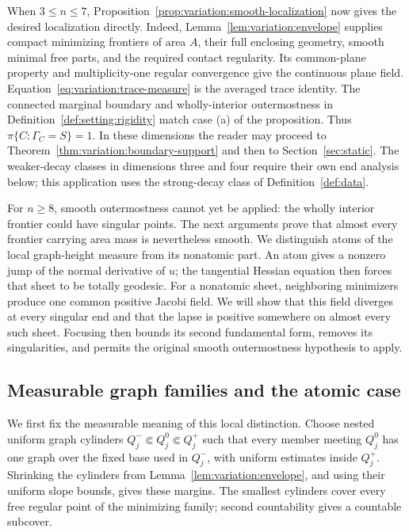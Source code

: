 When $3\leq n\leq7$, Proposition~\ref{prop:variation:smooth-localization}
now gives the desired localization directly. Indeed,
Lemma~\ref{lem:variation:envelope} supplies compact minimizing frontiers
of area $A$, their full enclosing geometry, smooth minimal free parts,
and the required contact regularity. Its common-plane property and
multiplicity-one regular convergence give the continuous plane field.
Equation~\eqref{eq:variation:trace-measure} is the averaged trace identity.
The connected marginal boundary and wholly-interior outermostness in
Definition~\ref{def:setting:rigidity} match case \textup{(a)} of the
proposition. Thus $\pi\{C:\Gamma_C=S\}=1$.
In these dimensions the reader may proceed to
Theorem~\ref{thm:variation:boundary-support} and then to
Section~\ref{sec:static}. The weaker-decay classes in dimensions three
and four require their own end analysis below; this application uses
the strong-decay class of Definition~\ref{def:data}.


For $n\geq8$, smooth outermostness cannot yet be applied: the wholly
interior frontier could have singular points. The next arguments prove
that almost every frontier carrying area mass is nevertheless smooth.
We distinguish atoms of the local graph-height measure from its
nonatomic part.
An atom gives a nonzero jump of the normal derivative of $u$; the
tangential Hessian equation then forces that sheet to be totally
geodesic. For a nonatomic sheet, neighboring minimizers produce one
common positive Jacobi field. We will show that this field diverges
at every singular end and that the lapse is positive somewhere on
almost every such sheet. Focusing then bounds its second fundamental
form, removes its singularities, and permits the original smooth
outermostness hypothesis to apply.

\subsection{Measurable graph families and the atomic case}
\label{subsec:variation:graph-families}

We first fix the measurable meaning of this local distinction. Choose
nested uniform graph cylinders
$Q_j^-\Subset Q_j^0\Subset Q_j^+$ such that every member meeting $Q_j^0$
has one graph over the fixed base used in $Q_j^-$, with uniform estimates
inside $Q_j^+$. Shrinking the cylinders from
Lemma~\ref{lem:variation:envelope}, and using their uniform slope bounds,
gives these margins. The smallest cylinders cover every free regular
point of the minimizing family; second countability gives a countable
subcover.

